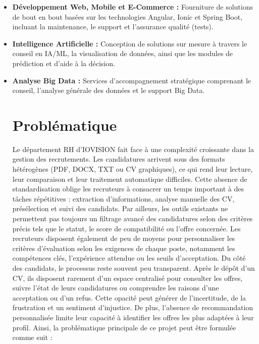 \documentclass[12pt,a4paper,oneside]{report}
\begin{document}
\begin{itemize}
    \item \textbf{Développement Web, Mobile et E-Commerce :}
    Fourniture de solutions de bout en bout basées sur les technologies Angular, Ionic et Spring Boot, incluant la maintenance, le support et l'assurance qualité (tests).

    \item \textbf{Intelligence Artificielle :}
   Conception de solutions sur mesure à travers le conseil en IA/ML, la visualisation de données, ainsi que les modules de prédiction et d'aide à la décision.

    \item \textbf{Analyse Big Data :}
   Services d'accompagnement stratégique comprenant le conseil, l'analyse générale des données et le support Big Data.



\section{Problématique}

Le département RH d’IOVISION fait face à une complexité croissante dans la gestion
des recrutements. Les candidatures arrivent sous des formats hétérogènes (PDF, DOCX,
TXT ou CV graphiques), ce qui rend leur lecture, leur comparaison et leur traitement
automatique difficiles. Cette absence de standardisation oblige les recruteurs à consacrer
un temps important à des tâches répétitives : extraction d’informations, analyse manuelle
des CV, présélection et suivi des candidats.
Par ailleurs, les outils existants ne permettent pas toujours un filtrage avancé des
candidatures selon des critères précis tels que le statut, le score de compatibilité ou l’offre
concernée. Les recruteurs disposent également de peu de moyens pour personnaliser les
critères d’évaluation selon les exigences de chaque poste, notamment les compétences clés,
l’expérience attendue ou les seuils d’acceptation.
Du côté des candidats, le processus reste souvent peu transparent. Après le dépôt d’un
CV, ils disposent rarement d’un espace centralisé pour consulter les offres, suivre l’état
de leurs candidatures ou comprendre les raisons d’une acceptation ou d’un refus. Cette
opacité peut générer de l’incertitude, de la frustration et un sentiment d’injustice. De plus,
l’absence de recommandation personnalisée limite leur capacité à identifier les offres les
plus adaptées à leur profil.
Ainsi, la problématique principale de ce projet peut être formulée comme suit :



\end{itemize}
\end{document}
